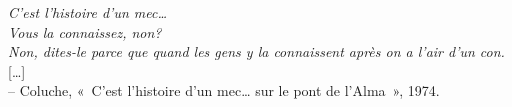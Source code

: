 \documentclass[../main.tex]{subfiles}
\begin{document}
\begin{citationPage}
\textit{
C’est l’histoire d’un mec… \\
Vous la connaissez, non? \\
Non, dites-le parce que quand les gens y la connaissent après on a l’air d’un con. \\
}
\vspace{0.5cm}
[…] \\
\vspace{0.5cm}
– Coluche, «~C'est l'histoire d'un mec… sur le pont de l'Alma~», 1974.

\end{citationPage}
\end{document}
